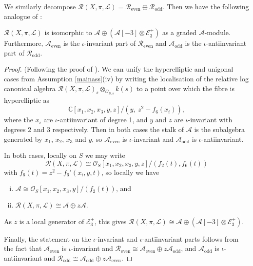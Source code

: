 \documentclass{amsart}
\begin{document}
We similarly decompose ${\mathcal{R}}(X,\pi,{\mathcal{L}}) = {\mathcal{R}}_{\mathrm{even}} \oplus {\mathcal{R}}_{\mathrm{odd}}$. Then we have the following analogue of \cite[Lemma 4.3]{flgi}:

\begin{lemma} \label{Rprops} ${\mathcal{R}}(X,\pi,{\mathcal{L}})$ is isomorphic to ${\mathcal{A}} \oplus ({\mathcal{A}}[-3] \otimes {\mathcal{E}}_3^+)$ as a graded ${\mathcal{A}}$-module. Furthermore, ${\mathcal{A}}_{\mathrm{even}}$ is the $\iota$-invariant part of ${\mathcal{R}}_{\mathrm{even}}$ and ${\mathcal{A}}_{\mathrm{odd}}$ is the $\iota$-antiinvariant part of ${\mathcal{R}}_{\mathrm{odd}}$. \end{lemma}
\begin{proof} (Following the proof of \cite[Lemma 4.3]{flgi}). We can unify the hyperelliptic and unigonal cases from Assumption \ref{mainass}(iv) by writing the localisation of the relative log canonical algebra ${\mathcal{R}}(X,\pi,{\mathcal{L}})_s \otimes_{{\mathcal{O}}_{S,s}} k(s)$ to a point over which the fibre is hyperelliptic as
\[ {\mathbb{C}}[x_1,x_2,x_3,y,z]/(y,\ z^2 - f_6(x_i)),\]
where the $x_i$ are $\iota$-antiinvariant of degree 1, and $y$ and $z$ are $\iota$-invariant with degrees 2 and 3 respectively. Then in both cases the stalk of ${\mathcal{A}}$ is the subalgebra generated by $x_1$, $x_2$, $x_3$ and $y$, so ${\mathcal{A}}_{\mathrm{even}}$ is $\iota$-invariant and ${\mathcal{A}}_{\mathrm{odd}}$ is $\iota$-antiinvariant.

In both cases, locally on $S$ we may write 
\[{\mathcal{R}}(X,\pi,{\mathcal{L}}) \cong {\mathcal{O}}_S[x_1,x_2,x_3,y,z]/(f_2(t), f_6(t))\] 
with $f_6(t) = z^2 - f_6'(x_i,y,t)$, so locally we have
\begin{enumerate}[(i)]
\item ${\mathcal{A}} \cong {\mathcal{O}}_S[x_1,x_2,x_3,y]/(f_2(t))$, and
\item ${\mathcal{R}}(X,\pi,{\mathcal{L}}) \cong {\mathcal{A}} \oplus z{\mathcal{A}}$.
\end{enumerate}
As $z$ is a local generator of ${\mathcal{E}}_3^+$, this gives ${\mathcal{R}}(X,\pi,{\mathcal{L}}) \cong {\mathcal{A}} \oplus ({\mathcal{A}}[-3] \otimes {\mathcal{E}}_3^+)$.

Finally, the statement on the $\iota$-invariant and $\iota$-antiinvariant parts follows from the fact that ${\mathcal{A}}_{\mathrm{even}}$ is $\iota$-invariant and ${\mathcal{R}}_{\mathrm{even}} \cong {\mathcal{A}}_{\mathrm{even}} \oplus z{\mathcal{A}}_{\mathrm{odd}}$, and  ${\mathcal{A}}_{\mathrm{odd}}$ is $\iota$-anti\-invariant and ${\mathcal{R}}_{\mathrm{odd}} \cong {\mathcal{A}}_{\mathrm{odd}} \oplus z{\mathcal{A}}_{\mathrm{even}}$.\end{proof}
\end{document}
